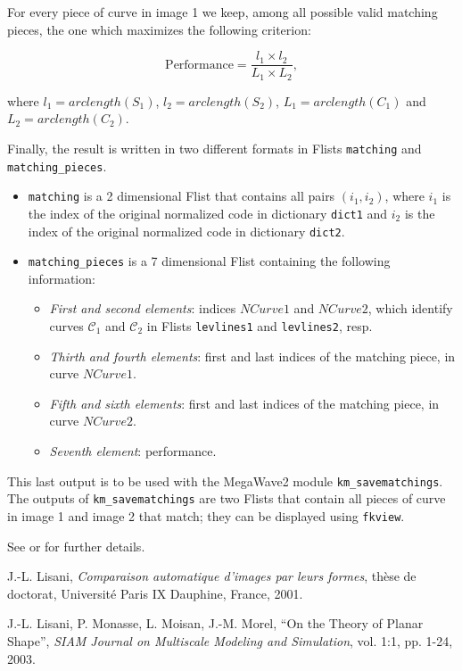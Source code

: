 For every piece of curve in image 1 we keep, among all possible valid
matching pieces, the one which maximizes the following criterion:

$$\mbox{Performance} = \frac{l_1 \times l_2}{L_1 \times L_2},$$

where $l_1=arclength(S_1)$, $l_2=arclength(S_2)$, $L_1=arclength(C_1)$
and $L_2=arclength(C_2)$.

Finally, the result is written in two different formats in Flists
\verb+matching+ and \verb+matching_pieces+. 

\begin{itemize}

\item \verb+matching+ is a 2 dimensional Flist that contains all pairs
$(i_1,i_2)$, where $i_1$ is the index of the original normalized code
in dictionary \verb+dict1+ and $i_2$ is the index of the original
normalized code in dictionary \verb+dict2+.

\item \verb+matching_pieces+ is a 7 dimensional Flist containing the following information:

  \begin{itemize}

  \item {\em First and second elements}: indices $NCurve1$ and
    $NCurve2$, which identify curves ${\mathcal C}_1$ and ${\mathcal C}_2$
    in Flists \verb+levlines1+ and \verb+levlines2+, resp.
  
  \item {\em Thirth and fourth elements}: first and last indices of the
    matching piece, in curve $NCurve1$.

  \item {\em Fifth and sixth elements}: first and last indices of the
    matching piece, in curve $NCurve2$.

  \item {\em Seventh element}: performance.
    
  \end{itemize}

\end{itemize}

This last output is to be used with the MegaWave2
module \verb+km_savematchings+. The
outputs of \verb+km_savematchings+ are two Flists that contain all pieces of
curve in image 1 and image 2 that match; they can be displayed using
\verb+fkview+.

\bigskip
See \cite{joseluis} or \cite{LMMM} for further details.


\begin{thebibliography}{9}

 J.-L. {\sc Lisani}, {\it Comparaison automatique
d'images par leurs formes}, th\`ese de doctorat, Universit\'e Paris IX
Dauphine, France, 2001.

 J.-L. Lisani, P. Monasse, L. Moisan, J.-M. Morel, 
``On the Theory of Planar Shape'', 
{\it SIAM Journal on Multiscale Modeling and Simulation}, 
vol. 1:1, pp. 1-24, 2003. 

\end{thebibliography}

